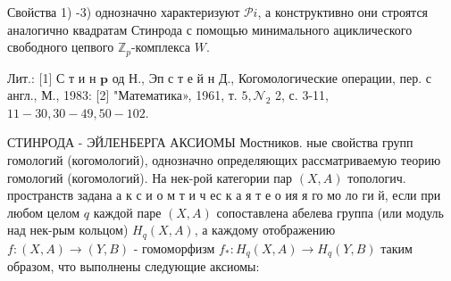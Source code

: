 \documentclass[10pt]{article}
\begin{document}
Свойства 1) -3) однозначно характеризуют $\mathscr{P} i$, а конструктивно они строятся аналогично квадратам Стинрода с помощью минимального ациклического свободного цепвого $\mathbb{Z}_{p}$-комплекса $W$.



Лит.: [1] С т и н $\mathbf{p}$ од Н., Эп с т е й н Д., Когомологические операции, пер. с англ., М., 1983: [2] "Математика», 1961, т. $5, \mathcal{N}_{2}$ 2, с. 3-11, $11-30,30-49,50-102$.



СТИНРОДА - ЭЙЛЕНБЕРГА АКСИОМЫ Мостников. ные свойства групп гомологий (когомологий), однозначно определяющих рассматриваемую теорию гомологий (когомологий). На нек-рой категории пар $(X, A)$ топологич. пространств задана а к с и о м т и ч ес к а я т е о ия я го мо ло ги й, если при любом целом $q$ каждой паре $(X, A)$ сопоставлена абелева группа (или модуль над нек-рым кольцом) $H_{q}(X, A)$, а каждому отображению $f:(X, A) \rightarrow(Y, B)$ - гомоморфизм $f_{*}: H_{q}(X, A) \rightarrow H_{q}(Y, B)$ таким образом, что выполнены следующие аксиомы:
\end{document}
